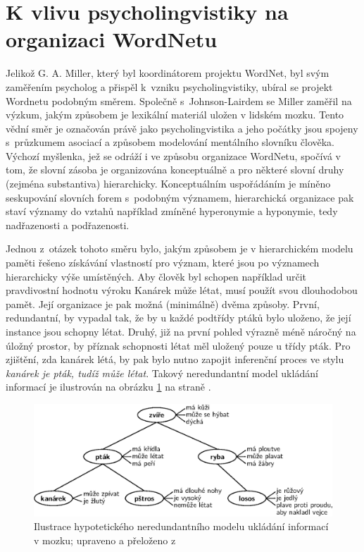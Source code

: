\documentclass[a4paper, 11pt, oneside, showtrims]{book}
\newcommand\ex{\textsf}
\begin{document}

			\section{K vlivu psycholingvistiky na organizaci WordNetu}
			\label{cha:psycho}

				Jelikož G. A. Miller, který byl koordinátorem projektu WordNet, byl svým zaměřením psycholog a přispěl k~vzniku psycholingvistiky, ubíral se projekt Wordnetu podobným směrem. Společně s~Johnson-Lairdem se Miller zaměřil na výzkum, jakým způsobem je lexikální materiál uložen v lidském mozku. Tento vědní směr je označován právě jako psycholingvistika a jeho počátky jsou spojeny s~průzkumem asociací a způsobem modelování mentálního slovníku člověka. Výchozí myšlenka, jež se odráží i ve způsobu organizace WordNetu, spočívá v tom, že slovní zásoba je organizována konceptuálně a pro některé slovní druhy (zejména substantiva) hierarchicky. Konceptuálním uspořádáním je míněno seskupování slovních forem s~podobným významem, hierarchická organizace pak staví významy do vztahů například zmíněné hyperonymie a hyponymie, tedy nadřazenosti a podřazenosti.

				Jednou z~otázek tohoto směru bylo, jakým způsobem je v hierarchickém modelu paměti řešeno získávání vlastností pro význam, které jsou  po významech hierarchicky výše umístěných. Aby člověk byl schopen například určit pravdivostní hodnotu výroku \ex{Kanárek může létat}, musí použít svou dlouhodobou pamět. Její organizace je pak možná (minimálně) dvěma způsoby. První, redundantní, by vypadal tak, že by u každé podtřídy ptáků bylo uloženo, že její instance jsou schopny létat. Druhý, již na první pohled výrazně méně náročný na úložný prostor, by příznak schopnosti létat měl uložený pouze u třídy \ex{pták}. Pro zjištění, zda kanárek létá, by pak bylo nutno zapojit inferenční proces ve stylu \textit{kanárek je pták, tudíž může létat}. \parencite{collins1969retrieval} Takový neredundantní model ukládání informací je ilustrován na obrázku \ref{fig:canary-can-sing} na straně \pageref{fig:canary-can-sing}.

				\begin{figure}[h]
					\centering
					\includegraphics[width=1.0\textwidth]{canary-can-sing.eps}
					\caption{Ilustrace hypotetického neredundantního modelu ukládání informací v mozku; upraveno a přeloženo z~\textcite{collins1969retrieval}}
					\label{fig:canary-can-sing}
				\end{figure}
\end{document}
